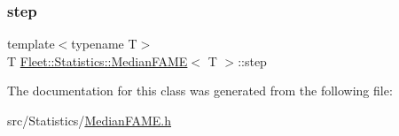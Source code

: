 \mbox{\label{class_fleet_1_1_statistics_1_1_median_f_a_m_e_a3451548541aad22bb7a1c35291faa357}} 
\subsubsection{\texorpdfstring{step}{step}}
{\footnotesize\ttfamily template$<$typename T$>$ \\
T \hyperlink{class_fleet_1_1_statistics_1_1_median_f_a_m_e}{Fleet\+::\+Statistics\+::\+Median\+F\+A\+ME}$<$ T $>$\+::step}



The documentation for this class was generated from the following file\+:\begin{DoxyCompactItemize}
\item 
src/\+Statistics/\hyperlink{_median_f_a_m_e_8h}{Median\+F\+A\+M\+E.\+h}\end{DoxyCompactItemize}
